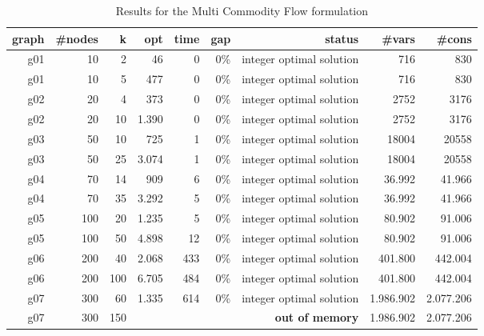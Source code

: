 \documentclass{article}
\begin{document}
	\begin{table}[htbp]
		\centering
		\caption{Results for the Multi Commodity Flow formulation}
		\begin{tabular}{rrr|rrrrrr}
			\toprule
			\textbf{graph} & \textbf{\#nodes} & \textbf{k} & \textbf{opt} & \textbf{time} & \textbf{gap} & \textbf{status} & \textbf{\#vars} & \textbf{\#cons} \\
			\midrule
			g01   & 10    & 2     & 46    & 0     & 0\%   & integer optimal solution & 716   & 830 \\
			g01   & 10    & 5     & 477   & 0     & 0\%   & integer optimal solution & 716   & 830 \\
			g02   & 20    & 4     & 373   & 0     & 0\%   & integer optimal solution & 2752  & 3176 \\
			g02   & 20    & 10    & 1.390 & 0     & 0\%   & integer optimal solution & 2752  & 3176 \\
			g03   & 50    & 10    & 725   & 1     & 0\%   & integer optimal solution & 18004 & 20558 \\
			g03   & 50    & 25    & 3.074 & 1     & 0\%   & integer optimal solution & 18004 & 20558 \\
			g04   & 70    & 14    & 909   & 6     & 0\%   & integer optimal solution & 36.992 & 41.966 \\
			g04   & 70    & 35    & 3.292 & 5     & 0\%   & integer optimal solution & 36.992 & 41.966 \\
			g05   & 100   & 20    & 1.235 & 5     & 0\%   & integer optimal solution & 80.902 & 91.006 \\
			g05   & 100   & 50    & 4.898 & 12    & 0\%   & integer optimal solution & 80.902 & 91.006 \\
			g06   & 200   & 40    & 2.068 & 433   & 0\%   & integer optimal solution & 401.800 & 442.004 \\
			g06   & 200   & 100   & 6.705 & 484   & 0\%   & integer optimal solution & 401.800 & 442.004 \\
			g07   & 300   & 60    & 1.335 & 614   & 0\%   & integer optimal solution & 1.986.902 & 2.077.206 \\
			g07   & 300   & 150   &       &       &       & \textbf{out of memory} & 1.986.902 & 2.077.206 \\
		\end{tabular}%
		\label{tab:MCF}%
	\end{table}%
	
\end{document}
